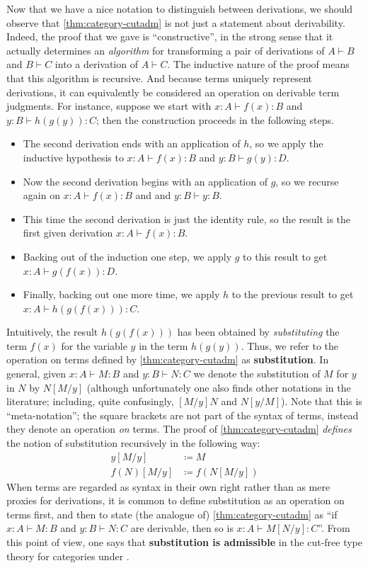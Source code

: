 \documentclass{book}
\let\types\vdash
\begin{document}
Now that we have a nice notation to distinguish between derivations, we should observe that \cref{thm:category-cutadm} is not just a statement about derivability.
Indeed, the proof that we gave is ``constructive'', in the strong sense that it actually determines an \emph{algorithm} for transforming a pair of derivations of $A\types B$ and $B\types C$ into a derivation of $A\types C$.
The inductive nature of the proof means that this algorithm is recursive.
And because terms uniquely represent derivations, it can equivalently be considered an operation on derivable term judgments.
For instance, suppose we start with $x:A \types f(x):B$ and $y:B\types h(g(y)):C$; then the construction proceeds in the following steps.
\begin{itemize}
\item The second derivation ends with an application of $h$, so we apply the inductive hypothesis to $x:A \types f(x):B$ and $y:B\types g(y):D$.
\item Now the second derivation begins with an application of $g$, so we recurse again on $x:A \types f(x):B$ and and $y:B\types y:B$.
\item This time the second derivation is just the identity rule, so the result is the first given derivation $x:A \types f(x):B$.
\item Backing out of the induction one step, we apply $g$ to this result to get $x:A\types g(f(x)):D$.
\item Finally, backing out one more time, we apply $h$ to the previous result to get $x:A\types h(g(f(x))):C$.
\end{itemize}
Intuitively, the result $h(g(f(x)))$ has been obtained by \emph{substituting} the term $f(x)$ for the variable $y$ in the term $h(g(y))$.
Thus, we refer to the operation on terms defined by \cref{thm:category-cutadm} as \textbf{substitution}.
In general, given $x:A\types M:B$ and $y:B\types N:C$ we denote the substitution of $M$ for $y$ in $N$ by $N[M/y]$ (although unfortunately one also finds other notations in the literature; including, quite confusingly, $[M/y]N$ and $N[y/M]$).
Note that this is ``meta-notation''; the square brackets are not part of the syntax of terms, instead they denote an operation \emph{on} terms.
The proof of \cref{thm:category-cutadm} \emph{defines} the notion of substitution recursively in the following way:
\begin{align*}
  y[M/y] &\coloneqq M\\
  f(N)[M/y] &\coloneqq f(N[M/y])
\end{align*}
When terms are regarded as syntax in their own right rather than as mere proxies for derivations, it is common to define substitution as an operation on terms first, and then to state (the analogue of) \cref{thm:category-cutadm} as ``if $x:A\types M:B$ and $y:B\types N:C$ are derivable, then so is $x:A\types M[N/y]:C$''.
From this point of view, one says that \textbf{substitution is admissible} in the cut-free type theory for categories under \cG.
\end{document}
